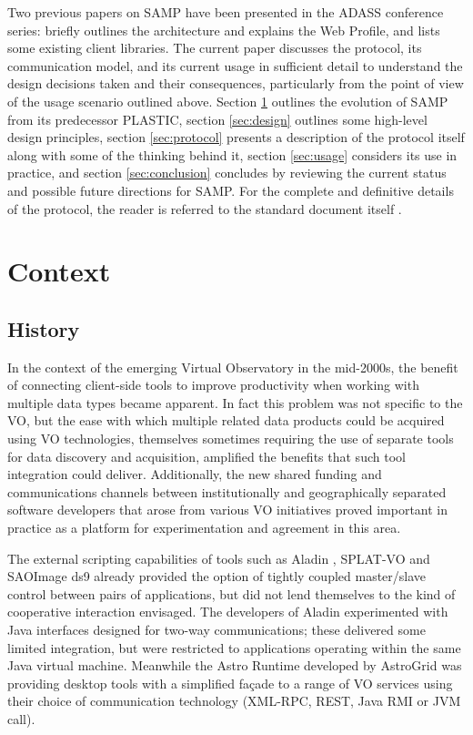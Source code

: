 \documentclass[5p]{elsarticle}
\begin{document}
Two previous papers on SAMP have been presented in the ADASS conference
series:
\citet{adassxxi_paper} briefly outlines the architecture and explains
the Web Profile, and \citet{adassxxii_bof} lists some existing
client libraries.
The current paper discusses the protocol,
its communication model, and its current usage
in sufficient detail to understand the design decisions taken
and their consequences,
particularly from the point of view of the usage scenario
outlined above.
Section \ref{sec:context} outlines the evolution of SAMP from
its predecessor PLASTIC,
section \ref{sec:design} outlines some high-level design principles,
section \ref{sec:protocol} presents a description of the protocol itself
along with some of the thinking behind it,
section \ref{sec:usage} considers its use in practice, and
section \ref{sec:conclusion} concludes by reviewing the current status
and possible future directions for SAMP.
For the complete and definitive details of the protocol,
the reader is referred to the standard document itself \citep{samp_std}.

\section{Context} \label{sec:context}

\subsection{History}

In the context of the emerging Virtual Observatory in the mid-2000s,
the benefit of connecting client-side tools to improve productivity
when working with multiple data types became apparent.
In fact this problem was not specific to the VO, 
but the ease with which multiple related data products
could be acquired using VO technologies,
themselves sometimes requiring the use of separate tools for
data discovery and acquisition,
amplified the benefits that such tool integration could deliver.
Additionally, the new shared funding and communications channels
between institutionally and geographically separated software developers
that arose from various VO initiatives
proved important in practice
as a platform for experimentation and agreement in this area.

The external scripting capabilities of tools such as
Aladin \citep{2000A&AS..143...33B},
SPLAT-VO \citep{ACVOsplat}
and SAOImage ds9 \citep{2003ASPC..295..489J}
already provided the option of tightly coupled master/slave
control between pairs of applications, but did not lend themselves
to the kind of cooperative interaction envisaged.
The developers of Aladin experimented with Java interfaces designed
for two-way communications; these delivered some limited integration,
but were restricted to applications operating within the same Java
virtual machine.
Meanwhile the Astro Runtime \citep{2007ASPC..376..571W} developed by
AstroGrid was providing desktop tools with a simplified fa\c{c}ade
to a range of VO services using their choice of communication
technology (XML-RPC, REST, Java RMI or JVM call).
\end{document}
